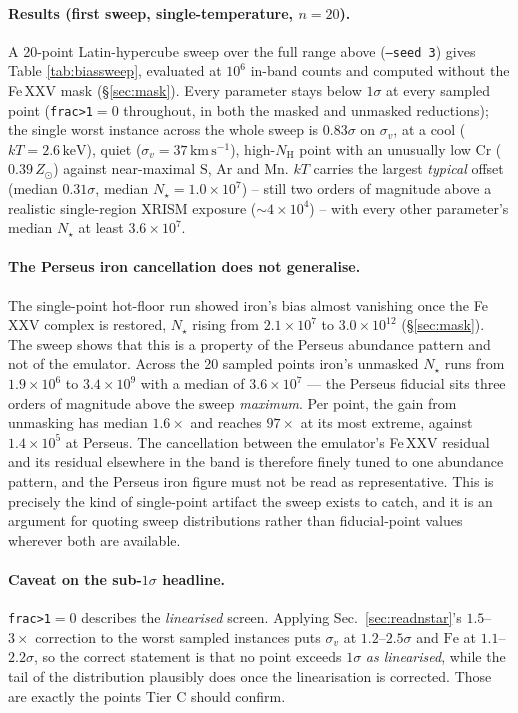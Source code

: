 \documentclass[11pt,a4paper]{article}
\newcommand{\nh}{N_{\mathrm{H}}}
\newcommand{\kev}{\,\mathrm{keV}}
\newcommand{\kms}{\,\mathrm{km\,s^{-1}}}
\newcommand{\zsun}{Z_\odot}
\newcommand{\code}[1]{\texttt{#1}}
\begin{document}
\paragraph{Results (first sweep, single-temperature, $n=20$).} A 20-point
Latin-hypercube sweep over the full range above (\code{--seed 3}) gives Table
\ref{tab:biassweep}, evaluated at $10^{6}$ in-band counts and computed without
the Fe\,XXV mask (\S\ref{sec:mask}). Every parameter stays below $1\sigma$ at
every sampled point (\code{frac>1}$=0$ throughout, in both the masked and
unmasked reductions); the single worst instance across the whole sweep is
$0.83\sigma$ on $\sigma_v$, at a cool ($kT=2.6\kev$), quiet
($\sigma_v=37\kms$), high-$\nh$ point with an unusually low
$\mathrm{Cr}$ ($0.39\,\zsun$) against near-maximal $\mathrm{S}$, $\mathrm{Ar}$
and $\mathrm{Mn}$. $kT$ carries the largest \emph{typical} offset (median
$0.31\sigma$, median $N_\star=1.0\times10^{7}$) -- still two orders of
magnitude above a realistic single-region XRISM exposure
(${\sim}4\times10^{4}$) -- with every other parameter's median $N_\star$ at
least $3.6\times10^{7}$.

\paragraph{The Perseus iron cancellation does not generalise.} The
single-point hot-floor run showed iron's bias almost vanishing once the
Fe\,XXV complex is restored, $N_\star$ rising from $2.1\times10^{7}$ to
$3.0\times10^{12}$ (\S\ref{sec:mask}). The sweep shows that this is a property
of the Perseus abundance pattern and not of the emulator. Across the 20 sampled
points iron's unmasked $N_\star$ runs from $1.9\times10^{6}$ to
$3.4\times10^{9}$ with a median of $3.6\times10^{7}$ --- the Perseus fiducial
sits three orders of magnitude above the sweep \emph{maximum}. Per point, the
gain from unmasking has median $1.6\times$ and reaches $97\times$ at its most
extreme, against $1.4\times10^{5}$ at Perseus. The cancellation between the
emulator's Fe\,XXV residual and its residual elsewhere in the band is therefore
finely tuned to one abundance pattern, and the Perseus iron figure must not be
read as representative. This is precisely the kind of single-point artifact the
sweep exists to catch, and it is an argument for quoting sweep distributions
rather than fiducial-point values wherever both are available.

\paragraph{Caveat on the sub-$1\sigma$ headline.} \code{frac>1}$=0$ describes
the \emph{linearised} screen. Applying Sec.~\ref{sec:readnstar}'s
$1.5$--$3\times$ correction to the worst sampled instances puts $\sigma_v$ at
$1.2$--$2.5\sigma$ and $\mathrm{Fe}$ at $1.1$--$2.2\sigma$, so the correct
statement is that no point exceeds $1\sigma$ \emph{as linearised}, while the
tail of the distribution plausibly does once the linearisation is corrected.
Those are exactly the points Tier C should confirm.
\end{document}
